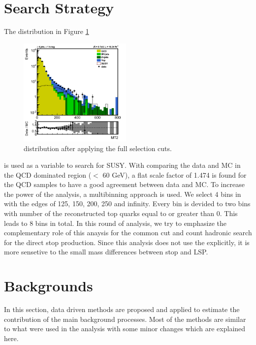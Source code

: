 \section{Search Strategy}
\label{sect:search}
The \mttwo distribution in Figure \ref{fig:MT2}
\begin{figure}[!htb]
\centering
\includegraphics[width=0.49\textwidth]{figs/MT2SmearedJetMET.png}
\caption{\mttwo distribution after applying the full selection cuts.}
\label{fig:MT2}
\end{figure}
is used as a variable to search for SUSY. With comparing the data and MC in the QCD dominated region (\mttwo $<$ 60 GeV), 
a flat scale factor of 1.474 is found for the QCD samples to have a good agreement between data and MC.
To increase the power of the analysis, a multibinning approach is used.
We select 4 bins in \mttwo with the edges of 125, 150, 200, 250 and infinity.
Every \mttwo bin is devided to two bins with number of the reconstructed top quarks equal to or greater than 0.
This leads to 8 bins in total. In this round of analysis, we try to emphasize the complementary role of this anaysis
for the common cut and count hadronic search for the direct stop production. Since this analysis does not use the \met explicitly, it is more sensetive to the small mass differences between stop and LSP.
\section{Backgrounds}
\label{sect:bkg}
In this section, data driven methods are proposed and applied to estimate the contribution of the main background processes. 
Most of the methods are similar to what were used in the \mttwo analysis \cite{MT2_2011} with some minor changes which are explained
here.

